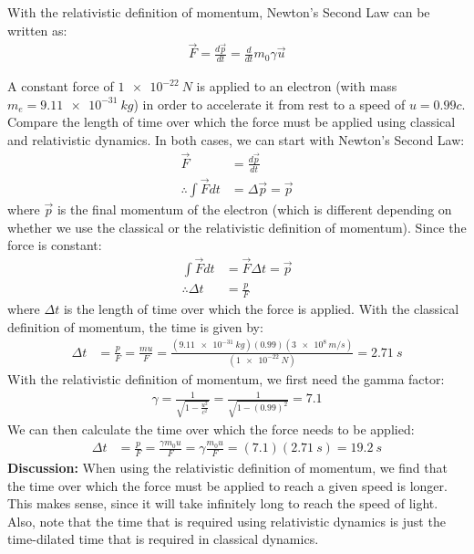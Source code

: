 With the relativistic definition of momentum, Newton's Second Law can be written as:
\begin{align*}
\vec F = \frac{d\vec p}{dt}=\frac{d}{dt}m_0\gamma\vec u 
\end{align*}

\begin{example}{A constant force of $\SI{1e-22}{N}$ is applied to an electron (with mass $m_e=\SI{9.11e-31}{kg}$) in order to accelerate it from rest to a speed of $u=0.99c$. Compare the length of time over which the force must be applied using classical and relativistic dynamics.}
In both cases, we can start with Newton's Second Law:
\begin{align*}
\vec F &= \frac{d\vec p}{dt}\\
\therefore \int \vec F dt &= \Delta \vec p = \vec p
\end{align*}
where $\vec p$ is the final momentum of the electron (which is different depending on whether we use the classical or the relativistic definition of momentum). Since the force is constant:
\begin{align*}
\int \vec F dt&=\vec F \Delta t=\vec p\\
\therefore \Delta t &=\frac{p}{F}
\end{align*}
where $\Delta t$ is the length of time over which the force is applied. With the classical definition of momentum, the time is given by:
\begin{align*}
 \Delta t &=\frac{p}{F} = \frac{mu}{F}=\frac{(\SI{9.11e-31}{kg})(0.99)(\SI{3e8}{m/s})}{(\SI{1e-22}{N})}=\SI{2.71}{s}
\end{align*}
With the relativistic definition of momentum, we first need the gamma factor:
\begin{align*}
\gamma = \frac{1}{\sqrt{1-\frac{u^2}{c^2}}}=\frac{1}{\sqrt{1-(0.99)^2}}=7.1
\end{align*}
We can then calculate the time over which the force needs to be applied:
\begin{align*}
\Delta t &=\frac{p}{F} = \frac{\gamma m_0u}{F}=\gamma  \frac{m_0u}{F}=(7.1)(\SI{2.71}{s})=\SI{19.2}{s}
\end{align*}
\textbf{Discussion: }When using the relativistic definition of momentum, we find that the time over which the force must be applied to reach a given speed is longer. This makes sense, since it will take infinitely long to reach the speed of light. Also, note that the time that is required using relativistic dynamics is just the time-dilated time that is required in classical dynamics.
\end{example}

